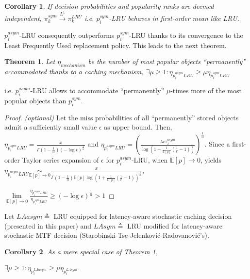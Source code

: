 \documentclass[conference]{IEEEtran}
\newtheorem{theorem}{Theorem}
\newtheorem{corollary}{Corollary}[theorem]
\begin{document}
\begin{corollary}
If decision probabilities and popularity ranks are deemed independent,
$\pi^{sym}_{k} \overset{L^1}{\rightarrow} \pi^{LRU}_k$
i.e. $p_i^{sym}$-LRU behaves in first-order mean like LRU.
\end{corollary}
$p_i^{asym}$-LRU consequently outperforms $p_i^{sym}$-LRU thanks to its convergence to the Least Frequently Used replacement policy\cite{DBLP:journals/corr/MartinaGL13}. This leads to the next theorem.

\begin{theorem}
\label{theorem_asym_gt_sym}
Let $\eta_{mechanism}$ be the number of most popular objects ``permanently'' accommodated thanks to a caching mechanism,
$\exists \mu \geq 1 : \eta_{p_i^{asym}LRU} \geq \mu \eta_{p_i^{sym}LRU}$
\end{theorem}
i.e. $p_i^{asym}$-LRU allows to accommodate ``permanently'' $\mu$-times more of the most popular objects than $p_i^{sym}$. 
\begin{proof}\textit{(optional)}
Let the miss probabilities of all ``permanently'' stored objects admit a sufficiently small value $\epsilon$ as upper bound.
Then, 
$\eta_{p_i^{sym}LRU} = \frac{x}{\Gamma(1 - \frac{1}{\alpha}) (-\log \epsilon)^\frac{1}{\alpha}}$
and 
$\eta_{p_i^{asym}LRU} = \left(\frac{ \lambda c \tau^{asym}_x}{\log(1 + \frac{1}{\mathbb{E}[p]}(\frac{1}{\epsilon} - 1))}\right)^\frac{1}{\alpha}$.
Since a first-order Taylor series expansion of $\epsilon$ for $p_i^{asym}$-LRU, when $\mathbb{E}[p] \to 0$, yields
$\eta_{p_i^{asym}LRU} \underset{\mathbb{E}[p] \to 0}{\sim} \frac{x}{\Gamma(1 - \frac{1}{\alpha}) \mathbb{E}[p] \log(1 + \frac{1}{\mathbb{E}[p]}(\frac{1}{\epsilon} - 1))^\frac{1}{\alpha}}$,

$\lim \limits_{\mathbb{E}[p] \to 0} \frac{\eta_{p_i^{asym}LRU}}{\eta_{p_i^{sym}LRU}} \geq  (-\log \epsilon)^\frac{1}{\alpha} > 1$

\end{proof}
Let $LAasym \triangleq$ LRU equipped for latency-aware stochastic caching decision (presented in this paper) 
and $LAsym \triangleq$  LRU modified for latency-aware stochastic MTF decision (Starobinski-Tse-Jelenkovi\'c-Radovanovi\'c's).
\begin{corollary}
\label{corollary_asym_gt_sym}
As a mere special case of Theorem \ref{theorem_asym_gt_sym}, 

$\exists \mu \geq 1 : \eta_{p_i^{LAasym}} \geq \mu \eta_{p_i^{LAsym}}$.
\end{corollary}
\end{document}

